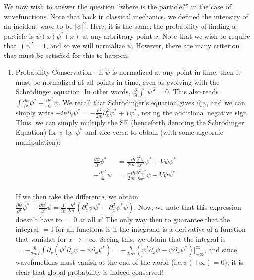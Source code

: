 \documentclass{report}
\begin{document}
We now wish to answer the question ``where is the particle?'' in the case of wavefunctions. Note that back in classical mechanics, we defined the intensity of an incident wave to be $|\psi|^2$. Here, it is the same; the probability of finding a particle is $\psi(x)\psi^*(x)$ at any arbritrary point $x$.  Note that we wish to require that $\int{\psi^2} = 1$, and so we will normalize $\psi$. However, there are many criterion that must be satisfied for this to happen:

\begin{enumerate}
    \item Probability Conservation - If $\psi$ is normalized at any point in time, then it must be normalized at all points in time, even as evolving with the Schr\"odinger equation. In other words, $\frac{\partial}{\partial t} \int{|\psi|^2} = 0$. This also reads $\int{\frac{\partial \psi}{\partial t} \psi^* + \frac{\partial \psi^*}{\partial t}\psi}$. We recall that Schr\"odinger's equation gives $\partial_t \psi$, and we can simply write $-i\hbar\partial_t\psi^* = -\frac{\hbar^2}{2m} \partial_x^2 \psi^* + V\psi^*$, noting the additional negative sign. Thus, we can simply multiply the SE (henceforth denoting the Schr\"odinger Equation) for $\psi$ by $\psi^*$ and vice versa to obtain (with some algebraic manipulation):

        \begin{align*}
            \frac{\partial \psi}{\partial t} \psi^* &= \frac{-i\hbar}{2m}\frac{\partial^2\psi}{\partial x^2}\psi^* + V\psi\psi^*\\
            -\frac{\partial \psi^*}{\partial t} \psi &= \frac{-i\hbar}{2m}\frac{\partial^2\psi^*}{\partial x^2}\psi + V\psi\psi^*\\
        \end{align*}
        
    If we then take the difference, we obtain $\frac{\partial \psi}{\partial t}\psi^* + \frac{\partial \psi^*}{\partial t}\psi = \frac{1}{i\hbar}\frac{-\hbar^2}{2m}\left(\partial_x^2\psi\psi^* - \partial_x^2\psi^*\psi\right)$. Now, we note that this expression doesn't have to $=0$ at all $x$! The only way then to guarantee that the integral $=0$ for all functions is if the integrand is a derivative of a function that vanishes for $x \to\pm\infty$. Seeing this, we obtain that the integral is $= -\frac{\hbar}{2mi}\int{\partial_x\left(\psi^*\partial_x\psi - \psi \partial_x\psi^*\right)} = -\frac{\hbar}{2mi}\left(\psi^*\partial_x\psi - \psi\partial_x\psi^*\right)\big|_{-\infty}^\infty$, and since wavefunctions must vanish at the end of the world (i.e.$\psi(\pm\infty) = 0$), it is clear that global probability is indeed conserved!


\end{enumerate}
\end{document}
